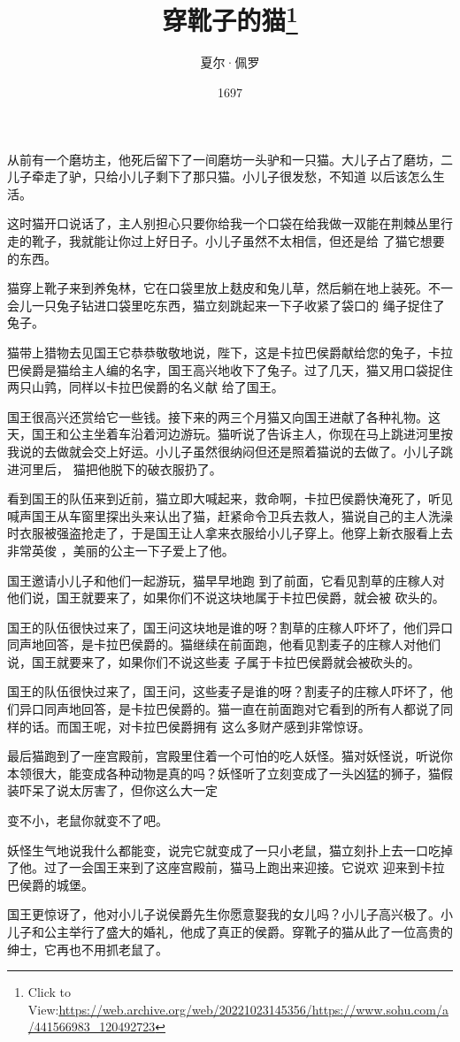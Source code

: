 \documentclass{article}
\title{穿靴子的猫\footnote{Click to View:\url{https://web.archive.org/web/20221023145356/https://www.sohu.com/a/441566983_120492723}}}
\author{夏尔·佩罗}
\date{1697}
\begin{document}

\maketitle


\Large

﻿从前有一个磨坊主，他死后留下了一间磨坊一头驴和一只猫。大儿子占了磨坊，二儿子牵走了驴，只给小儿子剩下了那只猫。小儿子很发愁，不知道
以后该怎么生活。 

这时猫开口说话了，主人别担心只要你给我一个口袋在给我做一双能在荆棘丛里行走的靴子，我就能让你过上好日子。小儿子虽然不太相信，但还是给
了猫它想要的东西。 

猫穿上靴子来到养兔林，它在口袋里放上麸皮和兔儿草，然后躺在地上装死。不一会儿一只兔子钻进口袋里吃东西，猫立刻跳起来一下子收紧了袋口的
绳子捉住了兔子。 

\newpage

猫带上猎物去见国王它恭恭敬敬地说，陛下，这是卡拉巴侯爵献给您的兔子，卡拉巴侯爵是猫给主人编的名字，国王高兴地收下了兔子。过了几天，猫又用口袋捉住两只山鹑，同样以卡拉巴侯爵的名义献
给了国王。 

国王很高兴还赏给它一些钱。接下来的两三个月猫又向国王进献了各种礼物。这天，国王和公主坐着车沿着河边游玩。猫听说了告诉主人，你现在马上跳进河里按我说的去做就会交上好运。小儿子虽然很纳闷但还是照着猫说的去做了。小儿子跳进河里后，
猫把他脱下的破衣服扔了。 

看到国王的队伍来到近前，猫立即大喊起来，救命啊，卡拉巴侯爵快淹死了，听见喊声国王从车窗里探出头来认出了猫，赶紧命令卫兵去救人，猫说自己的主人洗澡时衣服被强盗抢走了，于是国王让人拿来衣服给小儿子穿上。他穿上新衣服看上去非常英俊
，美丽的公主一下子爱上了他。 

国王邀请小儿子和他们一起游玩，猫早早地跑
\newpage
到了前面，它看见割草的庄稼人对他们说，国王就要来了，如果你们不说这块地属于卡拉巴侯爵，就会被
砍头的。 

国王的队伍很快过来了，国王问这块地是谁的呀？割草的庄稼人吓坏了，他们异口同声地回答，是卡拉巴侯爵的。猫继续在前面跑，他看见割麦子的庄稼人对他们说，国王就要来了，如果你们不说这些麦
子属于卡拉巴侯爵就会被砍头的。 

国王的队伍很快过来了，国王问，这些麦子是谁的呀？割麦子的庄稼人吓坏了，他们异口同声地回答，是卡拉巴侯爵的。猫一直在前面跑对它看到的所有人都说了同样的话。而国王呢，对卡拉巴侯爵拥有
这么多财产感到非常惊讶。 

最后猫跑到了一座宫殿前，宫殿里住着一个可怕的吃人妖怪。猫对妖怪说，听说你本领很大，能变成各种动物是真的吗？妖怪听了立刻变成了一头凶猛的狮子，猫假装吓呆了说太厉害了，但你这么大一定

\newpage
变不小，老鼠你就变不了吧。 

妖怪生气地说我什么都能变，说完它就变成了一只小老鼠，猫立刻扑上去一口吃掉了他。过了一会国王来到了这座宫殿前，猫马上跑出来迎接。它说欢
迎来到卡拉巴侯爵的城堡。 

国王更惊讶了，他对小儿子说侯爵先生你愿意娶我的女儿吗？小儿子高兴极了。小儿子和公主举行了盛大的婚礼，他成了真正的侯爵。穿靴子的猫从此了一位高贵的绅士，它再也不用抓老鼠了。
\end{document}
